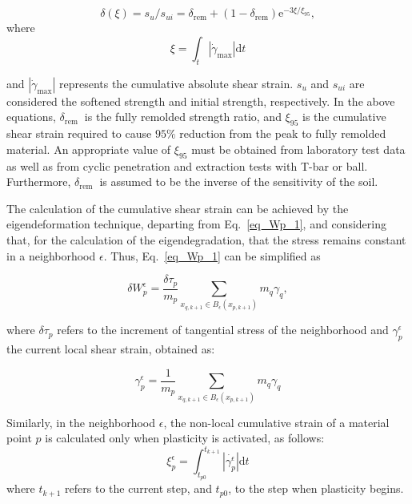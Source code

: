 \documentclass[applsci,journal,article,submit,moreauthors,pdftex]{Definitions/mdpi}
\begin{document}
\begin{equation} \label{eq16}
\delta(\xi)=s_{u} / s_{u i}=\delta_{\mathrm{rem}}+\left(1-\delta_{\mathrm{rem}}\right) \mathrm{e}^{-3 \xi / \xi_{95}},
\end{equation}
where
\begin{equation}\label{eq17}
\xi=\int_{t}\left|\dot{\gamma}_{\max }\right| \mathrm{d} t
\end{equation}

\noindent and $\left|\dot{\gamma}_{\max }\right|$ represents the cumulative absolute shear strain. $s_{u}$ and $s_{u i}$ are considered the softened strength and initial strength, respectively. In the above equations, $\delta_{\text {rem }}$ is the fully remolded strength ratio, and $\xi_{95}$ is the cumulative shear strain required to cause $95 \%$ reduction from the peak to fully remolded material.  An appropriate value of $\xi_{95}$ must be obtained from laboratory test data as well as from cyclic penetration and extraction tests with T-bar or ball. Furthermore, $\delta_{\text {rem }}$  is assumed to be the inverse of the sensitivity of the soil.

The calculation of the cumulative shear strain can be achieved by the eigendeformation technique, departing from Eq.~\eqref{eq_Wp_1}, and considering that, for the calculation of the eigendegradation, that the stress remains constant in a neighborhood $\epsilon$. Thus, Eq.~\eqref{eq_Wp_1} can be simplified as

\begin{equation}\label{eq_Wp_4}
\delta W^\epsilon_{p}=\frac{\delta \tau_p} {m_{p}} \sum_{x_{q,k+1}\in B_\epsilon (x_{p,k+1})} m_q \gamma_{q},
\end{equation}

\noindent where $\delta \tau_p$ refers to the increment of tangential stress of the neighborhood and $\gamma^{\epsilon}_{p}$ the current local shear strain, obtained as:

\begin{equation}\label{eq_Wp_5}
\gamma^{\epsilon}_{p}=\frac{1}{m_{p}}\sum_{x_{q,k+1}\in B_\epsilon (x_{p,k+1})}m_q \gamma_{q}
\end{equation}

Similarly, in the neighborhood $\epsilon$, the non-local cumulative strain of a material point $p$ is calculated only when plasticity is activated, as follows:
\begin{equation}\label{eq18}
\xi^{\epsilon}_{p}=\int^{t_{k+1}}_{t_{p0}}\left|\dot{\gamma^{\epsilon}_{p}}\right| \mathrm{d} t
\end{equation}
where $t_{k+1}$ refers to the current step, and $t_{p0}$, to the step when plasticity begins. 
\end{document}
